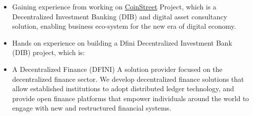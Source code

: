 \documentclass[10pt,a4paper]{altacv}
\begin{document}



\cvsubsubevent{}

\begin{itemize}
\item Gaining experience from working on \href{https://coinstreet.partners/}{CoinStreet} Project, which is a Decentralized Investment Banking (DIB) and digital asset consultancy solution, enabling business eco-system for the new era of digital economy.
\end{itemize}

\begin{itemize}
\item Hands on experience on building a Dfini Decentralized Investment Bank (DIB) project, which is:
\end{itemize}

\begin{mdframed}
\begin{itemize}
  \item \small{A Decentralized Finance (DFINI) A solution provider focused on the decentralized finance sector. We develop decentralized finance solutions that allow established institutions to adopt distributed ledger technology, and provide open finance platforms that empower individuals around the world to engage with new and restructured financial systems.} 
\end{itemize}

\end{mdframed}

\divider


\end{document}
